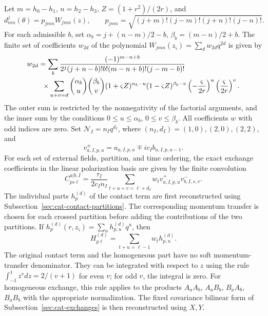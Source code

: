 \documentclass[11pt,a4paper]{article}
\begin{document}
Let $m=h_0-h_1$, $n=h_2-h_3$, $Z=(1+r^2)/(2r)$, and
\begin{equation}
 d^j_{mn}(\theta)=p_{jmn}W_{jmn}(z),\qquad
 p_{jmn}=\sqrt{(j+m)!(j-m)!(j+n)!(j-n)!}.
\label{eq:cat-angular-wigner-factor}
\end{equation}
For each admissible $b$, set $\alpha_b=j+(n-m)/2-b$, $\beta_b=(m-n)/2+b$. The finite set of coefficients $w_{2d}$ of the polynomial $W_{jmn}(z_\varsigma)=\sum_d w_{2d}q^{2d}$ is given by
\begin{equation}
\shortstack[l]{
$\displaystyle w_{2d}=\sum_b\frac{(-1)^{m-n+b}}{2^j(j+n-b)!b!(m-n+b)!(j-m-b)!}$\\
$\displaystyle \hspace{8mm}\times\sum_{u+v=d}\binom{\alpha_b}{u}\binom{\beta_b}{v}
 (1+\varsigma Z)^{\alpha_b-u}(1-\varsigma Z)^{\beta_b-v}
 \left(-\frac{\varsigma}{2r}\right)^u
 \left(\frac{\varsigma}{2r}\right)^v.$}
\label{eq:cat-angular-explicit-wigner-coefficients}
\end{equation}
The outer sum is restricted by the nonnegativity of the factorial arguments, and the inner sum by the conditions $0\leq u\leq \alpha_b$, $0\leq v\leq \beta_b$. All coefficients $w$ with odd indices are zero. Set $\mathcal N_I=n_Iq^{d_I}$, where $(n_I,d_I)=(1,0),(2,0),(2,2)$, and
\begin{equation}
 v_{a,I,p,u}^{\pm}=a_{a,I,p,u}\mp ic_I b_{a,I,p,u-1}.
\label{eq:cat-angular-velocity-shift}
\end{equation}
For each set of external fields, partition, and time ordering, the exact exchange coefficients in the linear polarization basis are given by the finite convolution
\begin{equation}
 C_{ps\ell}^{a|b,I}=\frac{\tau_I}{2c_In_I}
 \sum_{t+u+v=\ell+d_I}w_t
 v_{a,I,p,u}^{+}v_{b,I,s,v}^{-}.
\label{eq:cat-angular-exchange-convolution}
\end{equation}
The individual parts $h_p^{(d)}$ of the contact term are first reconstructed using Subsection~\ref{sec:cat-contact-partitions}. The corresponding momentum transfer is chosen for each crossed partition before adding the contributions of the two partitions. If $h_p^{(d)}(r,z_\varsigma)=\sum_u h_{p,u}^{(d)}q^u$, then
\begin{equation}
 H_{p\ell}^{(d)}=\sum_{t+u=\ell-1}w_t h_{p,u}^{(d)}.
\label{eq:cat-angular-contact-convolution}
\end{equation}
The original contact term and the homogeneous part have no soft momentum-transfer denominator. They can be integrated with respect to $z$ using the rule $\int_{-1}^{1}z^v dz=2/(v+1)$ for even $v$; for odd $v$, the integral is zero. For homogeneous exchange, this rule applies to the products $A_aA_b$, $A_aB_b$, $B_aA_b$, $B_aB_b$ with the appropriate normalization. The fixed covariance bilinear form of Subsection~\ref{sec:cat-exchanges} is then reconstructed using $X,Y$.
\end{document}
